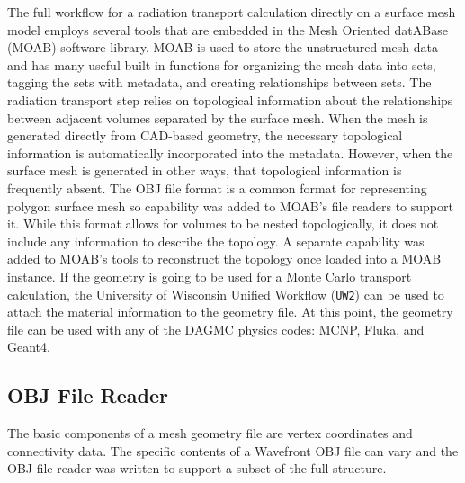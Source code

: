 \documentclass{anstrans}
\begin{document}
The full workflow for a radiation transport calculation directly on a surface mesh model
employs several tools that are embedded in the Mesh Oriented datABase (MOAB) software library\cite{moab}.
MOAB is used to store the unstructured mesh data 
and has many useful built in functions for organizing the mesh data into sets, 
tagging the sets with metadata, and creating relationships between sets.  The radiation transport step relies 
on topological information about the relationships between adjacent volumes separated by the surface mesh.
When the mesh is generated directly from CAD-based geometry, the necessary topological information
is automatically incorporated into the metadata.  However, when the surface mesh is generated in other
ways, that topological information is frequently absent.  The OBJ file format\cite{obj} is a common format for
representing polygon surface mesh so capability was
added to MOAB's file readers to support it.  While this format allows for volumes to be
nested topologically, it does not include any information to describe the topology.  A separate capability
was added to MOAB's tools to reconstruct the topology once loaded into a MOAB instance.
If the geometry is going to be used 
for a Monte Carlo transport calculation, the University of Wisconsin Unified Workflow (\texttt{UW2}) can be used to attach 
the material information to the geometry file.  At this point, the geometry file
can be used with any of the DAGMC physics codes: MCNP, Fluka, and Geant4.

\subsection{OBJ File Reader}
The basic components of a mesh geometry file are vertex coordinates and connectivity data.
The specific contents of a Wavefront OBJ file can vary \cite{obj} and the OBJ file reader
was written to support a subset of the full structure. 
\end{document}
